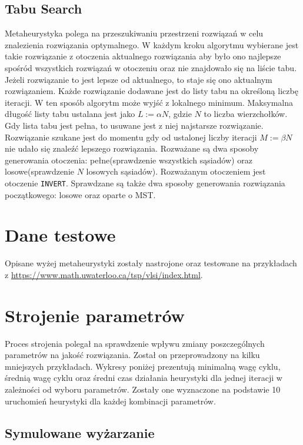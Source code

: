\documentclass{article}
\begin{document}
\subsection{Tabu Search}
Metaheurystyka polega na przeszukiwaniu przestrzeni rozwiązań w celu znalezienia rozwiązania optymalnego. 
\newline
W każdym kroku algorytmu wybierane jest takie rozwiązanie z otoczenia aktualnego rozwiązania
aby było ono najlepsze spośród wszystkich rozwiązań w otoczeniu oraz nie znajdowało się na liście tabu. Jeżeli rozwiązanie to jest lepsze od aktualnego, to staje się ono aktualnym rozwiązaniem.
Każde rozwiązanie dodawane jest do listy tabu na określoną liczbę iteracji. W ten sposób algorytm może wyjść z lokalnego minimum.
\newline
Maksymalna długość listy tabu ustalana jest jako $L := \alpha N$, gdzie $N$ to liczba wierzchołków. Gdy lista tabu jest pełna, to usuwane jest z niej najstarsze rozwiązanie.
Rozwiązanie szukane jest do momentu gdy od ustalonej liczby iteracji $M := \beta N$ nie udało się znaleźć lepszego rozwiązania.
\newline
Rozważane są dwa sposoby generowania otoczenia: pełne(sprawdzenie wszystkich sąsiadów) oraz losowe(sprawdzenie $N$ losowych sąsiadów). Rozważanym otoczeniem jest otoczenie \texttt{INVERT}.
Sprawdzane są także dwa sposoby generowania rozwiązania początkowego: losowe oraz oparte o MST.

\section{Dane testowe}
Opisane wyżej metaheurystyki zostały nastrojone oraz testowane na przykładach z \url{https://www.math.uwaterloo.ca/tsp/vlsi/index.html}.

\section{Strojenie parametrów}
Proces strojenia polegał na sprawdzenie wpływu zmiany poszczególnych parametrów na jakość rozwiązania. Został on przeprowadzony na kilku mniejszych przykładach.
Wykresy poniżej prezentują minimalną wagę cyklu, średnią wagę cyklu oraz średni czas działania heurystyki dla jednej iteracji w zależności od wyboru parametrów.
Zostały one wyznaczone na podstawie 10 uruchomień heurystyki dla każdej kombinacji parametrów.

\newpage

\subsection{Symulowane wyżarzanie}
\end{document}
